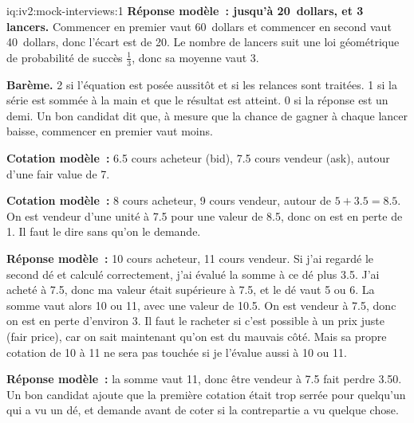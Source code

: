 \begin{solution}{iq:iv2:mock-interviews:1}
\ivstop
\textbf{Réponse modèle~: jusqu'à 20~dollars, et 3 lancers.} Commencer en premier vaut 60~dollars et commencer en second vaut 40~dollars, donc l'écart est de 20. Le nombre de lancers suit une loi géométrique de probabilité de succès $\tfrac13$, donc sa moyenne vaut 3.

\textbf{Barème.} 2 si l'équation est posée aussitôt et si les relances sont traitées. 1 si la série est sommée à la main et que le résultat est atteint. 0 si la réponse est un demi. Un bon candidat dit que, à mesure que la chance de gagner à chaque lancer baisse, commencer en premier vaut moins.

\ivstop
\textbf{Cotation modèle~:} 6.5 cours acheteur (bid), 7.5 cours vendeur (ask), autour d'une fair value de 7.

\ivstop
\textbf{Cotation modèle~:} 8 cours acheteur, 9 cours vendeur, autour de $5 + 3.5 = 8.5$. On est vendeur d'une unité à 7.5 pour une valeur de 8.5, donc on est en perte de 1. Il faut le dire sans qu'on le demande.

\ivstop
\textbf{Réponse modèle~:} 10 cours acheteur, 11 cours vendeur. Si j'ai regardé le second dé et calculé correctement, j'ai évalué la somme à ce dé plus 3.5. J'ai acheté à 7.5, donc ma valeur était supérieure à 7.5, et le dé vaut 5 ou 6. La somme vaut alors 10 ou 11, avec une valeur de 10.5. On est vendeur à 7.5, donc on est en perte d'environ 3. Il faut le racheter si c'est possible à un prix juste (fair price), car on sait maintenant qu'on est du mauvais côté. Mais sa propre cotation de 10 à 11 ne sera pas touchée si je l'évalue aussi à 10 ou 11.

\ivstop
\textbf{Réponse modèle~:} la somme vaut 11, donc être vendeur à 7.5 fait perdre 3.50. Un bon candidat ajoute que la première cotation était trop serrée pour quelqu'un qui a vu un dé, et demande avant de coter si la contrepartie a vu quelque chose.


\end{solution}

